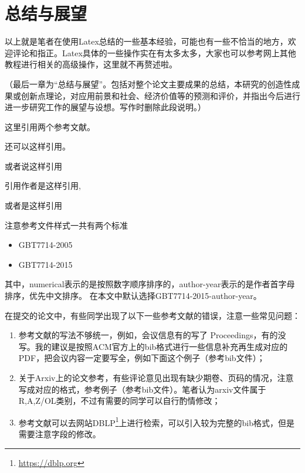 \chapter{总结与展望}


以上就是笔者在使用Latex总结的一些基本经验，可能也有一些不恰当的地方，欢迎评论和指正。Latex具体的一些操作实在有太多太多，大家也可以参考网上其他教程进行相关的高级操作，这里就不再赘述啦。

（最后一章为“总结与展望”。包括对整个论文主要成果的总结，本研究的创造性成果或创新点理论，对应用前景和社会、经济价值等的预测和评价，并指出今后进行进一步研究工作的展望与设想。写作时删除此段说明。）

这里引用两个参考文献\cite{2001Applying}\cite{2004PSO_ZhangLibiao}。

还可以这样引用\cite{2001Applying,2021A}。

或者说这样引用\cite{2001Applying,2004PSO_ZhangLibiao,2021A}

引用作者是这样引用\citet{2001Applying},\citet{2004PSO_ZhangLibiao}

或者是这样引用\citep{2001Applying}

注意参考文件样式一共有两个标准

\begin{itemize}
    \item GBT7714-2005
    \item GBT7714-2015
\end{itemize}

其中，numerical表示的是按照数字顺序排序的，author-year表示的是作者首字母排序，优先中文排序。
在本文中默认选择GBT7714-2015-author-year。

在提交的论文中，有些同学出现了以下一些参考文献的错误，注意一些常见问题：
\begin{enumerate}
    \item 参考文献的写法不够统一，例如，会议信息有的写了 Proceedings，有的没写。我的建议是按照ACM官方上的bib格式进行一些信息补充再生成对应的PDF，把会议内容一定要写全，例如下面这个例子\citet{zheng-etal-2017-joint}（参考bib文件）；
    \item 关于Arxiv上的论文参考，有些评论意见出现有缺少期卷、页码的情况，注意写成对应的格式，参考例子\citet{wang2023instructuie}（参考bib文件）。笔者认为arxiv文件属于R,A,Z/OL类别，不过有需要的同学可以自行酌情修改；
    \item 参考文献可以去网站DBLP\footnote{\url{https://dblp.org}}上进行检索，可以引入较为完整的bib格式，但是需要注意字段的修改。
\end{enumerate}
